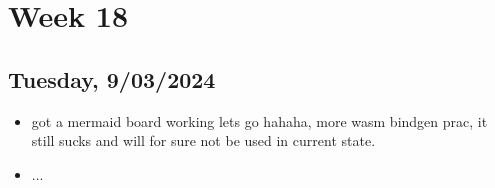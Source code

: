 \newpage
\section{Week 18}

\subsection*{Tuesday, 9/03/2024}
\begin{itemize}
    \item got a mermaid board working lets go hahaha, more wasm bindgen prac, it
        still sucks and will for sure not be used in current state.
    \item ...
\end{itemize}
